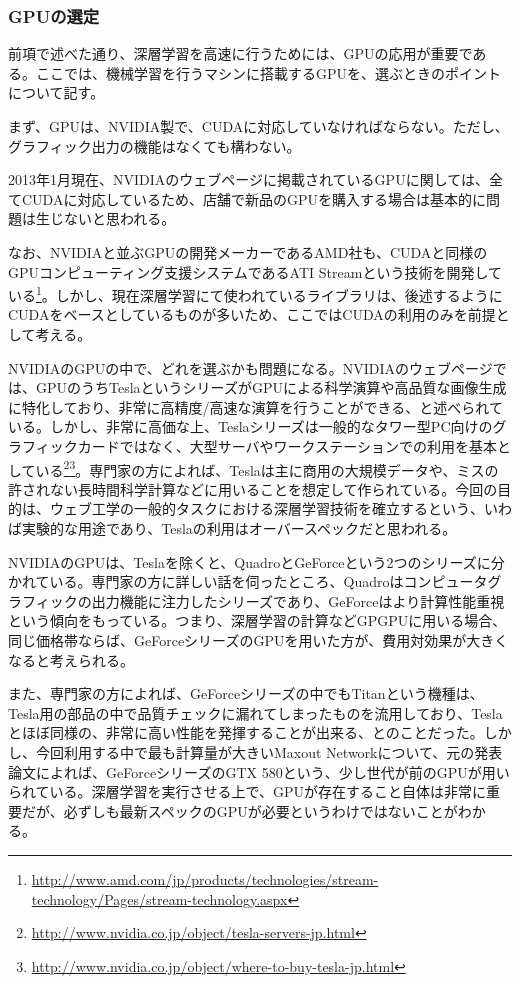 \subsubsection{GPUの選定}
前項で述べた通り、深層学習を高速に行うためには、GPUの応用が重要である。ここでは、機械学習を行うマシンに搭載するGPUを、選ぶときのポイントについて記す。\par
まず、GPUは、NVIDIA製で、CUDAに対応していなければならない。ただし、グラフィック出力の機能はなくても構わない。\par2013年1月現在、NVIDIAのウェブページに掲載されているGPUに関しては、全てCUDAに対応しているため、店舗で新品のGPUを購入する場合は基本的に問題は生じないと思われる。\par
なお、NVIDIAと並ぶGPUの開発メーカーであるAMD社も、CUDAと同様のGPUコンピューティング支援システムであるATI Streamという技術を開発している\footnote{\url{http://www.amd.com/jp/products/technologies/stream-technology/Pages/stream-technology.aspx}}。しかし、現在深層学習にて使われているライブラリは、後述するようにCUDAをベースとしているものが多いため、ここではCUDAの利用のみを前提として考える。\par
NVIDIAのGPUの中で、どれを選ぶかも問題になる。NVIDIAのウェブページでは、GPUのうちTeslaというシリーズがGPUによる科学演算や高品質な画像生成に特化しており、非常に高精度/高速な演算を行うことができる、と述べられている。しかし、非常に高価な上、Teslaシリーズは一般的なタワー型PC向けのグラフィックカードではなく、大型サーバやワークステーションでの利用を基本としている\footnote{\url{http://www.nvidia.co.jp/object/tesla-servers-jp.html}}\footnote{\url{http://www.nvidia.co.jp/object/where-to-buy-tesla-jp.html}}。専門家の方によれば、Teslaは主に商用の大規模データや、ミスの許されない長時間科学計算などに用いることを想定して作られている。今回の目的は、ウェブ工学の一般的タスクにおける深層学習技術を確立するという、いわば実験的な用途であり、Teslaの利用はオーバースペックだと思われる。\par
NVIDIAのGPUは、Teslaを除くと、QuadroとGeForceという2つのシリーズに分かれている。専門家の方に詳しい話を伺ったところ、Quadroはコンピュータグラフィックの出力機能に注力したシリーズであり、GeForceはより計算性能重視という傾向をもっている。つまり、深層学習の計算などGPGPUに用いる場合、同じ価格帯ならば、GeForceシリーズのGPUを用いた方が、費用対効果が大きくなると考えられる。\par
また、専門家の方によれば、GeForceシリーズの中でもTitanという機種は、Tesla用の部品の中で品質チェックに漏れてしまったものを流用しており、Teslaとほぼ同様の、非常に高い性能を発揮することが出来る、とのことだった。しかし、今回利用する中で最も計算量が大きいMaxout Networkについて、元の発表論文によれば、GeForceシリーズのGTX 580という、少し世代が前のGPUが用いられている。深層学習を実行させる上で、GPUが存在すること自体は非常に重要だが、必ずしも最新スペックのGPUが必要というわけではないことがわかる。


